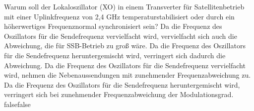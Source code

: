     {Warum soll der Lokaloszillator (XO) in einem Transverter für Satellitenbetrieb mit einer Uplinkfrequenz von 2,4 GHz temperaturstabilisiert oder durch ein höherwertiges Frequenznormal synchronisiert sein?}
    {Da die Frequenz des Oszillators für die Sendefrequenz vervielfacht wird, vervielfacht sich auch die Abweichung, die für SSB-Betrieb zu groß wäre. }
    {Da die Frequenz des Oszillators für die Sendefrequenz heruntergemischt wird, verringert sich dadurch die Abweichung. }
    {Da die Frequenz des Oszillators für die Sendefrequenz vervielfacht wird, nehmen die Nebenaussendungen mit zunehmender Frequenzabweichung zu. }
    {Da die Frequenz des Oszillators für die Sendefrequenz heruntergemischt wird, verringert sich bei zunehmender Frequenzabweichung der Modulationsgrad. }
    {false}{false}